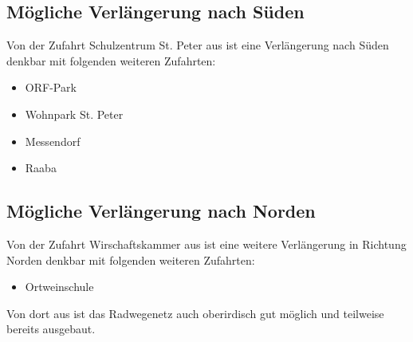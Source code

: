 \subsection{Mögliche Verlängerung nach Süden}
Von der Zufahrt Schulzentrum St. Peter aus ist eine Verlängerung nach Süden denkbar mit folgenden weiteren Zufahrten:
\begin{itemize}
    \item ORF-Park
    \item Wohnpark St. Peter
    \item Messendorf
    \item Raaba
\end{itemize}

\subsection{Mögliche Verlängerung nach Norden}
Von der Zufahrt Wirschaftskammer aus ist eine weitere Verlängerung in Richtung Norden denkbar mit folgenden weiteren Zufahrten:
\begin{itemize}
    \item Ortweinschule
\end{itemize}

Von dort aus ist das Radwegenetz auch oberirdisch gut möglich und teilweise bereits ausgebaut.